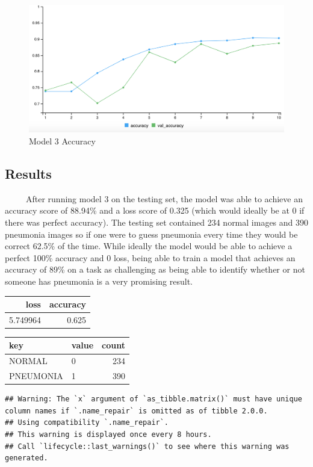 \documentclass[12pt]{article}
\begin{document}
\begin{figure}

{\centering \includegraphics[width=0.75\linewidth,height=0.25\textheight]{images/model3out} 

}

\caption{Model 3 Accuracy}\label{fig:sample-fig11}
\end{figure}

\hypertarget{results}{%
\subsection{Results}\label{results}}

~~~~~After running model 3 on the testing set, the model was able to
achieve an accuracy score of 88.94\% and a loss score of 0.325 (which
would ideally be at 0 if there was perfect accuracy). The testing set
contained 234 normal images and 390 pneumonia images so if one were to
guess pneumonia every time they would be correct 62.5\% of the time.
While ideally the model would be able to achieve a perfect 100\%
accuracy and 0 loss, being able to train a model that achieves an
accuracy of 89\% on a task as challenging as being able to identify
whether or not someone has pneumonia is a very promising result.

\begin{tabular}{r|r}
\hline
loss & accuracy\\
\hline
5.749964 & 0.625\\
\hline
\end{tabular}

\begin{tabular}{l|l|r}
\hline
key & value & count\\
\hline
NORMAL & 0 & 234\\
\hline
PNEUMONIA & 1 & 390\\
\hline
\end{tabular}

\begin{verbatim}
## Warning: The `x` argument of `as_tibble.matrix()` must have unique column names if `.name_repair` is omitted as of tibble 2.0.0.
## Using compatibility `.name_repair`.
## This warning is displayed once every 8 hours.
## Call `lifecycle::last_warnings()` to see where this warning was generated.
\end{verbatim}
\end{document}
